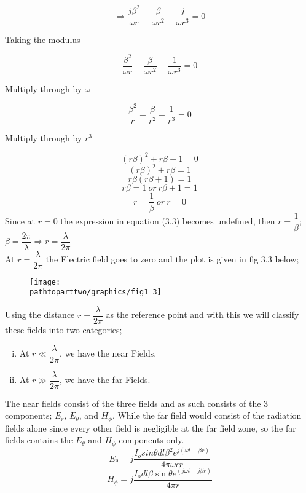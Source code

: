 $$\Longrightarrow  \dfrac{j\beta^2}{\omega r} + \dfrac{\beta}{\omega r^2} - \dfrac{j}{\omega r^3} = 0 $$
\begin{center}
Taking the modulus
\end{center} 
$$  \dfrac{\beta^2}{\omega r} + \dfrac{\beta}{\omega r^2} - \dfrac{1}{\omega r^3} = 0 $$
\begin{center}
Multiply through by $\omega$
\end{center}
$$  \dfrac{\beta^2}{r} + \dfrac{\beta}{r^2} - \dfrac{1}{r^3} = 0 $$
\begin{center}
Multiply through by $r^3$
\end{center} 
$$  (r\beta)^2 + r\beta - 1 = 0 $$
$$  (r\beta)^2 + r\beta = 1 $$
$$  r\beta(r\beta + 1) = 1 $$
$$ r\beta = 1 \ or \ r\beta + 1 = 1 $$
$$ r = \dfrac{1}{\beta} \ or \ r = 0 $$
Since at $ r = 0$ the expression in equation (3.3) becomes undefined, then $ r = \dfrac{1}{\beta} $; $\beta = \dfrac{2\pi}{\lambda} \Longrightarrow r =  \dfrac{\lambda}{2 \pi} $ \\ 
At $ r =  \dfrac{\lambda}{2 \pi} $ the Electric field goes to zero and the plot is given in fig 3.3 below;
\begin{figure}[h]
\centering
\texttt{[image: \\pathtoparttwo/graphics/fig1\_3]}
\caption{}
\label{fig:1}
\end{figure}
Using the distance $r =  \dfrac{\lambda}{2 \pi}$ as the reference point and with this we will classify these fields into two categories;
\begin{enumerate}[(i)]
\item At $r \ll  \dfrac{\lambda}{2 \pi}$, we have the near Fields.
\item At $r \gg  \dfrac{\lambda}{2 \pi}$, we have the far Fields.
\end{enumerate}
The near fields consist of the three fields and as such consists of the $3$ components; $E_r$, $E_{\theta}$, and $H_{\phi}$. While the far field would consist of the radiation fields alone since every other field is negligible at the far field zone, so the far fields contains the $E_\theta$ and $H_\phi$ components only. 
$$E_{\theta} = j\dfrac{I_osin \theta dl\beta^2 e^{j(\omega t - \beta r)}}{4\pi \omega \epsilon r}$$
$$H_\phi = j\dfrac{I_o dl \beta \sin\theta   e^{(j\omega t-j\beta r)} }{4\pi r} $$


